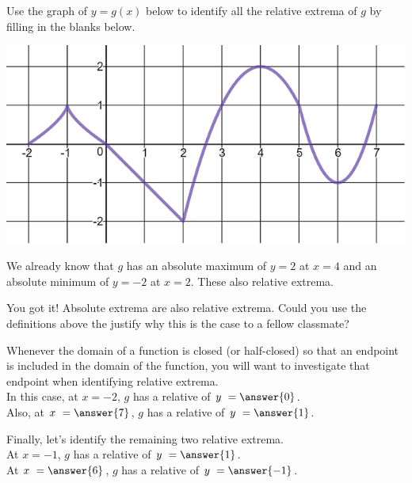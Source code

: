 \documentclass{ximera}
\begin{document}
\begin{exercise}
Use the graph of $y = g(x)$ below to identify all the relative extrema of $g$ by filling in the blanks below. 

\begin{center} \includegraphics[scale=0.5]{extrema3new.png} \end{center}

We already know that $g$ has an absolute maximum of $y = 2$ at $x=4$ and an absolute minimum of $y=-2$ at $x=2$.  These  also relative extrema.  

\begin{feedback}[correct]
You got it!  Absolute extrema are also relative extrema.  Could you use the definitions above the justify why this is the case to a fellow classmate?
\end{feedback}

\begin{exercise}
Whenever the domain of a function is closed (or half-closed) so that an endpoint is included in the domain of the function, you will want to investigate that endpoint when identifying relative extrema.  \\

In this case, at $x = -2$, $g$ has a relative  of $y \ = \answer{0}$.  \\

Also, at $x \ =\answer{7}$, $g$ has a relative  of $y \ = \answer{1}$.  \\

\begin{exercise}
Finally, let's identify the remaining two relative extrema. \\

At $x = -1$, $g$ has a relative  of $y \ = \answer{1}$.  \\

At $x \ = \answer{6}$, $g$ has a relative  of $y \ = \answer{-1}$.  \\

\end{exercise}

\end{exercise}


\end{exercise}
\end{document}
